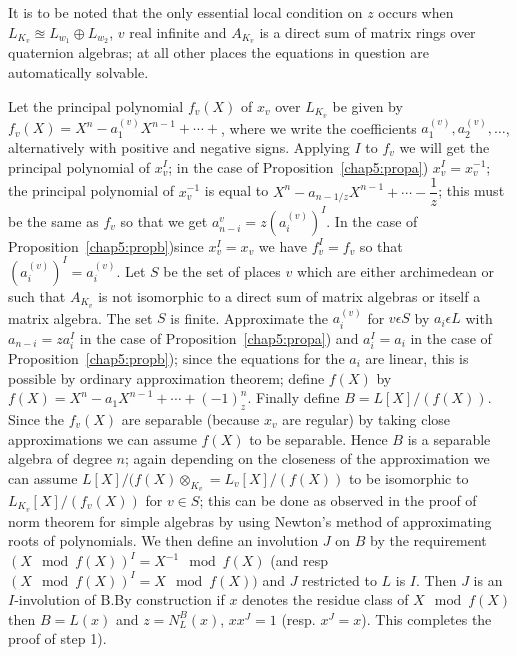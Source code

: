 \begin{remark*}
It is to be noted that the only essential local condition on $z$ occurs
when $L_{K_v}\approxeq L_{w_1} \oplus L_{w_2}$, $v$ real infinite and
$A_{K_v}$ is a direct sum of matrix rings over quaternion algebras; at
all other places the equations in question are automatically
solvable. 
\end{remark*}

Let the principal polynomial $f_v(X)$ of $x_v$ over $L_{K_v}$ be given
by\pageoriginale\break $f_v(X)=X^n-a_1^{(v)}X^{n-1}+\cdots +$, where we write the
coefficients $a_1^{(v)},a_2^{(v)},\ldots $, alternatively with positive
and negative signs. Applying $I$ to $f_v$ we will get the principal
polynomial of $x_v^{I}$; in the case of Proposition~\ref{chap5:propa})
$x_v^I=x_v^{-1}$; the principal polynomial of $x_v^{-1}$ is equal to
$X^n-a_{n-1/z}X^{n-1}+\cdots -\dfrac{1}{z}$; this must be the same as
$f_v$ so that we get $a^{v}_{n-i}=z(a^{(v)}_i)^I$. In the case of
Proposition~\ref{chap5:propb})since $x^{I}_{v}=x_v$ we have $f^I_v=f_v$ so that
$(a^{(v)}_i)^I=a^{(v)}_i$. Let $S$ be the set of places $v$ which are
either archimedean or such that $A_{K_v}$ is not isomorphic to a
direct sum of matrix algebras or itself a matrix algebra. The set $S$
is finite. Approximate the $a^{(v)}_i$ for $v\epsilon S$ by
$a_i\epsilon L$ with $a_{n-i}=za^{I}_{i}$ in the case of Proposition~\ref{chap5:propa}) 
and $a^{I}_{i}=a_i$ in the case of Proposition~\ref{chap5:propb}); since the
equations for the $a_i$ are linear, this is possible by ordinary
approximation theorem; define $f(X)$ by
$f(X)=X^n-a_1X^{n-1}+\cdots +(-1)^n_z$. Finally define $B=L[X]/
(f(X))$. Since the $f_v(X)$ are separable (because $x_v$ are regular)
by taking close approximations we can assume $f(X)$ to be
separable. Hence $B$ is a separable algebra of degree $n$; again
depending on the closeness of the approximation we can assume
$L[X]/(f(X)\otimes_{K_v}=L_v[X]/(f(X))$ to be isomorphic to
$L_{K_v}[X]/(f_v(X))$ for $v \in S$; this can be done as observed
in the proof of norm theorem for simple algebras by using Newton's
method of approximating roots of polynomials. We then define an
involution $J$ on $B$ by the requirement $(X\mod f(X))^I = X^{-1}\mod
f(X)$ (and resp $(X \mod f(X))^I= X\mod f(X))$  and  $J$
restricted to $L$ is $I$. Then $J$ is an $I$-involution of
B.\pageoriginale By construction if $x$ denotes the residue class of
$X \mod f(X)$ then $B=L(x)$ and $z=N^B_L(x)$, $xx^J=1$
(resp. $x^J=x$). This completes the proof of step 1).  



